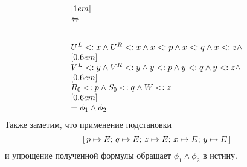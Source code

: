 \[\begin{array}{l}
    [1em] \\
    \Leftrightarrow \\
    [1em] \\
    {U}^{L} <: x \land {U}^{R} <: x \land x <: p \land x <: q \land x <: z \land \\
    [0.6em] \\
    {V}^{L} <: y \land {V}^{R} <: y \land y <: p \land y <: q \land y <: z \land \\
    [0.6em] \\
    {R}_{0} <: p \land {S}_{0} <: q \land {W} <: z \\
    [0.6em] \\
    = \phi_{1} \land \phi_{2}
    \end{array}
\]
Также заметим, что применение подстановки
\[
    \textrm{[} \, p \mapsto {E}; \, q \mapsto {E}; \,
    z \mapsto {E}; \, x \mapsto {E}; \,
    y \mapsto {E} \, \textrm{]}
\]
и упрощение полученной формулы обращает $\phi_{1} \land \phi_{2}$ в истину.

